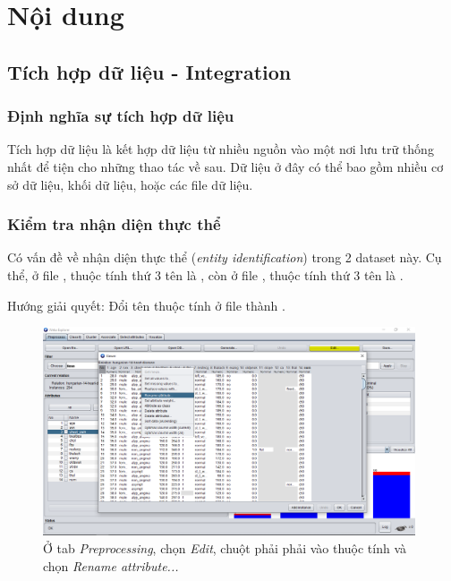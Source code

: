 \section{Nội dung}
\subsection{Tích hợp dữ liệu - Integration}
\subsubsection{Định nghĩa sự tích hợp dữ liệu}
Tích hợp dữ liệu là kết hợp dữ liệu từ nhiều nguồn vào một nơi lưu trữ thống nhất để tiện cho những thao tác về sau. Dữ liệu ở đây có thể bao gồm nhiều cơ sở dữ liệu, khối dữ liệu, hoặc các file dữ liệu.

\subsubsection{Kiểm tra nhận diện thực thể}
Có vấn đề về nhận diện thực thể (\textit{entity identification}) trong 2 dataset này. Cụ thể, ở file , thuộc tính thứ 3 tên là , còn ở file , thuộc tính thứ 3 tên là .

Hướng giải quyết: Đổi tên thuộc tính  ở file  thành .
\begin{figure}[H]
\centering
\includegraphics[width=0.98\textwidth]{1/b1.png}
\caption{Ở tab \textit{Preprocessing}, chọn \textit{Edit}, chuột phải phải vào thuộc tính  và chọn \textit{Rename attribute...}}
\end{figure}


